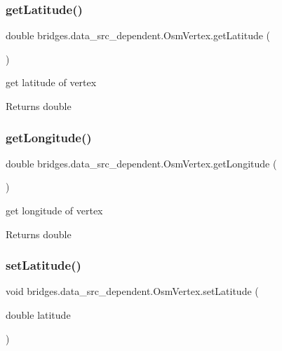\subsubsection{\texorpdfstring{getLatitude()}{getLatitude()}}
{\footnotesize\ttfamily double bridges.\+data\+\_\+src\+\_\+dependent.\+Osm\+Vertex.\+get\+Latitude (\begin{DoxyParamCaption}{ }\end{DoxyParamCaption})}

get latitude of vertex \begin{DoxyReturn}{Returns}
double 
\end{DoxyReturn}
\mbox{\label{classbridges_1_1data__src__dependent_1_1_osm_vertex_a73ce32c2897be14aa893822ce4081f3d}} 
\subsubsection{\texorpdfstring{getLongitude()}{getLongitude()}}
{\footnotesize\ttfamily double bridges.\+data\+\_\+src\+\_\+dependent.\+Osm\+Vertex.\+get\+Longitude (\begin{DoxyParamCaption}{ }\end{DoxyParamCaption})}

get longitude of vertex \begin{DoxyReturn}{Returns}
double 
\end{DoxyReturn}
\mbox{\label{classbridges_1_1data__src__dependent_1_1_osm_vertex_afda8504609680c855ea81f0c679298e9}} 
\subsubsection{\texorpdfstring{setLatitude()}{setLatitude()}}
{\footnotesize\ttfamily void bridges.\+data\+\_\+src\+\_\+dependent.\+Osm\+Vertex.\+set\+Latitude (\begin{DoxyParamCaption}\item[{double}]{latitude }\end{DoxyParamCaption})}

